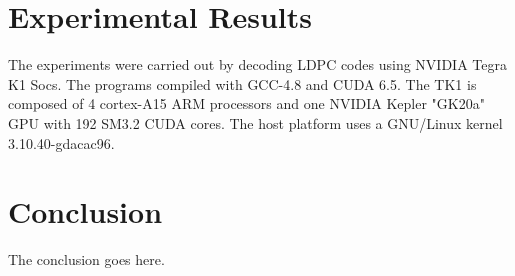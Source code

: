 \documentclass[conference]{IEEEtran}
\begin{document}
\section{Experimental Results}

The experiments were carried out by decoding LDPC codes using NVIDIA Tegra K1 Socs. The programs compiled with GCC-4.8 and CUDA 6.5. The TK1 is composed of 4 cortex-A15 ARM processors and one NVIDIA Kepler "GK20a" GPU with 192 SM3.2 CUDA cores. The host platform uses a GNU/Linux kernel 3.10.40-gdacac96. 

\section{Conclusion}
The conclusion goes here.

\newpage






\end{document}
